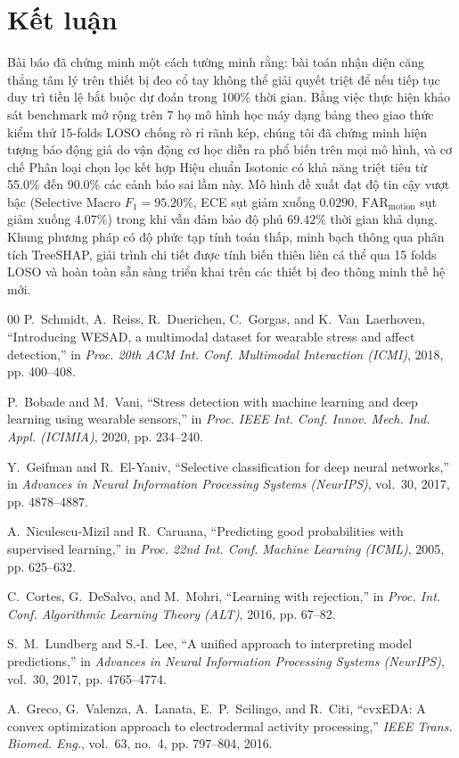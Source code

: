 \documentclass[conference]{IEEEtran}
\begin{document}
\section{Kết luận}
Bài báo đã chứng minh một cách tường minh rằng: bài toán nhận diện căng thẳng tâm lý trên thiết bị đeo cổ tay không thể giải quyết triệt để nếu tiếp tục duy trì tiền lệ bắt buộc dự đoán trong 100\% thời gian. Bằng việc thực hiện khảo sát benchmark mở rộng trên 7 họ mô hình học máy dạng bảng theo giao thức kiểm thử 15-folds LOSO chống rò rỉ rãnh kép, chúng tôi đã chứng minh hiện tượng báo động giả do vận động cơ học diễn ra phổ biến trên mọi mô hình, và cơ chế Phân loại chọn lọc kết hợp Hiệu chuẩn Isotonic có khả năng triệt tiêu từ 55.0\% đến 90.0\% các cảnh báo sai lầm này. Mô hình đề xuất đạt độ tin cậy vượt bậc (Selective Macro $F_1 = 95.20\%$, ECE sụt giảm xuống $0.0290$, $\text{FAR}_{\text{motion}}$ sụt giảm xuống $4.07\%$) trong khi vẫn đảm bảo độ phủ $69.42\%$ thời gian khả dụng. Khung phương pháp có độ phức tạp tính toán thấp, minh bạch thông qua phân tích TreeSHAP, giải trình chi tiết được tính biến thiên liên cá thể qua 15 folds LOSO và hoàn toàn sẵn sàng triển khai trên các thiết bị đeo thông minh thế hệ mới.

\begin{thebibliography}{00}
P.~Schmidt, A.~Reiss, R.~Duerichen, C.~Gorgas, and K.~Van~Laerhoven, ``Introducing WESAD, a multimodal dataset for wearable stress and affect detection,'' in \textit{Proc. 20th ACM Int. Conf. Multimodal Interaction (ICMI)}, 2018, pp. 400--408.

P.~Bobade and M.~Vani, ``Stress detection with machine learning and deep learning using wearable sensors,'' in \textit{Proc. IEEE Int. Conf. Innov. Mech. Ind. Appl. (ICIMIA)}, 2020, pp. 234--240.

Y.~Geifman and R.~El-Yaniv, ``Selective classification for deep neural networks,'' in \textit{Advances in Neural Information Processing Systems (NeurIPS)}, vol.~30, 2017, pp. 4878--4887.

A.~Niculescu-Mizil and R.~Caruana, ``Predicting good probabilities with supervised learning,'' in \textit{Proc. 22nd Int. Conf. Machine Learning (ICML)}, 2005, pp. 625--632.

C.~Cortes, G.~DeSalvo, and M.~Mohri, ``Learning with rejection,'' in \textit{Proc. Int. Conf. Algorithmic Learning Theory (ALT)}, 2016, pp. 67--82.

S.~M.~Lundberg and S.-I.~Lee, ``A unified approach to interpreting model predictions,'' in \textit{Advances in Neural Information Processing Systems (NeurIPS)}, vol.~30, 2017, pp. 4765--4774.

A.~Greco, G.~Valenza, A.~Lanata, E.~P.~Scilingo, and R.~Citi, ``cvxEDA: A convex optimization approach to electrodermal activity processing,'' \textit{IEEE Trans. Biomed. Eng.}, vol.~63, no.~4, pp. 797--804, 2016.
\end{thebibliography}
\end{document}
